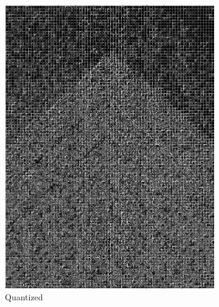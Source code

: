 \documentclass[landscape,a0paper,fontscale=0.5]{baposter} %
\begin{document}
\begin{poster}
{\begin{figure}[H]
\begin{subfigure}{0.2\textwidth}
		\includegraphics[scale=0.115]{5Pattern.jpg}
		\caption{Quantized} %
	\end{subfigure}
	\vspace{1em} %
	\begin{subfigure}{0.2\textwidth} %

\end{subfigure}
\end{figure}}
\end{poster}
\end{document}
